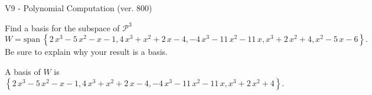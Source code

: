 \begin{exercise}
  \begin{exerciseTitle}V9 - Polynomial Computation (ver. 800)\end{exerciseTitle}
  \begin{exerciseStatement}
    Find a basis for the subspace of \(\mathcal{P}^3\) 
\[W=\mathrm{span}\ \left\{2 \, x^{3} - 5 \, x^{2} - x - 1 , 4 \, x^{3} + x^{2} + 2 \, x - 4 , -4 \, x^{3} - 11 \, x^{2} - 11 \, x , x^{3} + 2 \, x^{2} + 4 , x^{2} - 5 \, x - 6\right\}.\]
 Be sure to explain why your result is a basis.


  \end{exerciseStatement}
  \begin{exerciseAnswer}
   A basis of \(W\) is  \(\left\{2 \, x^{3} - 5 \, x^{2} - x - 1 , 4 \, x^{3} + x^{2} + 2 \, x - 4 , -4 \, x^{3} - 11 \, x^{2} - 11 \, x , x^{3} + 2 \, x^{2} + 4\right\}\).
  


  \end{exerciseAnswer}
\end{exercise}